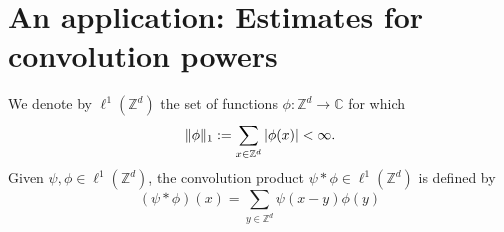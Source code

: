 \documentclass[smallextended]{svjour3}
\theoremstyle{remark}
\begin{document}















\section{An application: Estimates for convolution powers}\label{sec:ConvolutionPowers}



We denote by $\ell^1(\mathbb{Z}^d)$ the set of functions $\phi:\mathbb{Z}^d\to\mathbb{C}$ for which
\begin{equation*}
\|\phi\|_1:=\sum_{x\in\mathbb{Z}^d}\abs{\phi(x)}<\infty.
\end{equation*}
Given $\psi,\phi\in \ell^1(\mathbb{Z}^d)$, the convolution product $\psi\ast\phi\in\ell^1(\mathbb{Z}^d)$ is defined by
\begin{equation*}
\left(\psi\ast\phi\right)(x)=\sum_{y\in\mathbb{Z}^d}\psi(x-y)\phi(y)
\end{equation*}
\end{document}
